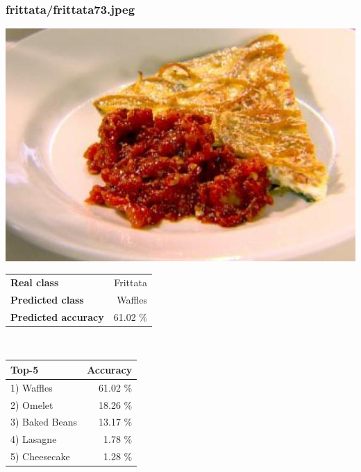 \subsubsection{frittata/frittata73.jpeg}

\begin{minipage}[t]{0.4\textwidth}
	\vspace{0pt}
	\includegraphics[width=\linewidth]{images/evaluation-images/frittata/frittata73.jpeg}
\end{minipage}
\hfill
\begin{minipage}[t]{0.5\textwidth}
	\vspace{0pt}\raggedright
	\begin{tabularx}{\textwidth}{X r}
		\small \textbf{Real class} & \small Frittata\\
		\small \textbf{Predicted class} & \small Waffles\\
		\small \textbf{Predicted accuracy} & \small 61.02 \%
    \end{tabularx}\\
    
    \vspace{6pt}
	\begin{tabularx}{\textwidth}{X r}
        \small \textbf{Top-5} & \small \textbf{Accuracy} \\
        \hline
		\small 1) Waffles & \small 61.02 \%\\\small 2) Omelet & \small 18.26 \%\\\small 3) Baked Beans & \small 13.17 \%\\\small 4) Lasagne & \small 1.78 \%\\\small 5) Cheesecake & \small 1.28 \%
    \end{tabularx}
\end{minipage}
    

